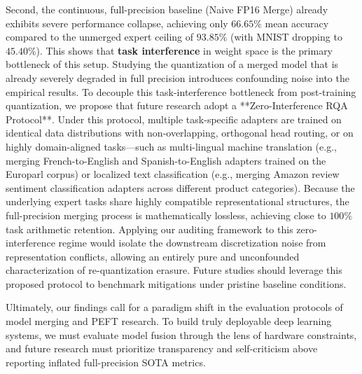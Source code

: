 Second, the continuous, full-precision baseline (Naive FP16 Merge) already exhibits severe performance collapse, achieving only $66.65\%$ mean accuracy compared to the unmerged expert ceiling of $93.85\%$ (with MNIST dropping to $45.40\%$). This shows that \textbf{task interference} in weight space is the primary bottleneck of this setup. Studying the quantization of a merged model that is already severely degraded in full precision introduces confounding noise into the empirical results. To decouple this task-interference bottleneck from post-training quantization, we propose that future research adopt a **Zero-Interference RQA Protocol**. Under this protocol, multiple task-specific adapters are trained on identical data distributions with non-overlapping, orthogonal head routing, or on highly domain-aligned tasks—such as multi-lingual machine translation (e.g., merging French-to-English and Spanish-to-English adapters trained on the Europarl corpus) or localized text classification (e.g., merging Amazon review sentiment classification adapters across different product categories). Because the underlying expert tasks share highly compatible representational structures, the full-precision merging process is mathematically lossless, achieving close to $100\%$ task arithmetic retention. Applying our auditing framework to this zero-interference regime would isolate the downstream discretization noise from representation conflicts, allowing an entirely pure and unconfounded characterization of re-quantization erasure. Future studies should leverage this proposed protocol to benchmark mitigations under pristine baseline conditions.

Ultimately, our findings call for a paradigm shift in the evaluation protocols of model merging and PEFT research. To build truly deployable deep learning systems, we must evaluate model fusion through the lens of hardware constraints, and future research must prioritize transparency and self-criticism above reporting inflated full-precision SOTA metrics.